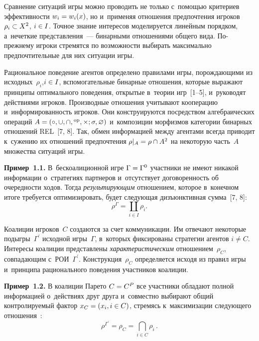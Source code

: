 \begin{multicols}{2}
Срав\-не\-ние 
ситуаций игры мож\-но проводить не только с~по\-мощью критериев эф\-фек\-тив\-ности 
$w_i\hm= w_i(x)$, но и~применяя отношения предпочтения игроков $\rho_i\hm\subset 
X^2$, $i\hm\in I$. Точ\-ное знание интересов моделируется линейным порядком, 
а~нечеткие пред\-став\-ле\-ния~--- бинарными отношениями общего вида. 
 По-преж\-не\-му игроки стремятся по воз\-мож\-ности выбирать максимально 
предпочтительные для них ситуации игры. 
    
    Рациональное поведение агентов определено правилами игры, по\-рож\-да\-ющи\-ми 
из исходных~$\rho_i$,\linebreak $i\hm\in I$, вспомогательные бинарные отношения, \mbox{которые} 
выражают принципы оптимального поведения, открытые в~тео\-рии игр~[1--5], 
и~руководят действиями игроков. Производные отношения \mbox{учитывают} кооперацию 
и~ин\-фор\-ми\-ро\-ван\-ность игроков. Они конструируются посредством ал\-геб\-ра\-и\-че\-ских 
операций ${A}\hm= (\circ, \cup, \cap, {}^{\mathrm{op}}, \times; \sigma, \varnothing)$ 
и~композиции морфизмов категории бинарных отношений REL~[7, 8]. Так, обмен 
информацией между агентами всегда приводит к~сужению их отношений 
предпочтения $\rho\vert_A \hm= \rho\cap A^2$ на некоторую часть~$A$ множества 
ситуаций игры.
    
    \textbf{Пример~1.1.} В~бескоалиционной игре $\Gamma\hm= \Gamma^0$ 
участ\-ни\-ки не имеют никакой информации о~стратегиях партнеров и~отсутствует 
до\-го\-во\-рен\-ность об оче\-ред\-ности ходов. Тогда \textit{ре\-зуль\-ти\-ру\-ющим} отношением, 
которое в~конечном итоге требуется оптимизировать, будет сле\-ду\-ющая 
дизъ\-юнк\-тив\-ная сумма~[7, 8]:
    \begin{equation}
    \rho^{\Gamma}= \coprod\limits_{i\in I} \rho_i.
    \label{e1.1-vas}
    \end{equation}
    
    Коалиции игроков~$C$ создаются за счет коммуникации. Им отвечают 
некоторые подыг\-ры~$\Gamma^\prime$ исходной игры~$\Gamma$, в~которых 
фиксированы стратегии агентов $i \not= C$. Интересы коалиции пред\-став\-ле\-ны 
\textit{характеристическим} отношением~$\rho_C$, сов\-па\-да\-ющим 
с~РОИ~$\Gamma^\prime$. Конструкция~$\rho_C$ 
определяется исходя из правил игры и~принципа рационального поведения 
участ\-ни\-ков коалиции. 
    
    \textbf{Пример~1.2.} В коалиции Парето $C\hm= C^P$ все участники обладают 
полной информацией о~действиях друг друга и~со\-вмест\-но выбирают общий 
конт\-ро\-ли\-ру\-емый фактор $x_C\hm= (x_i, i\in C)$, стремясь к~максимизации 
сле\-ду\-юще\-го от\-но\-ше\-ния~\cite{3-vas}:
    \begin{equation}
    \rho^{\Gamma^\prime} = \rho_C = \mathop{\bigcap}\limits_{i\in C} \rho_i\,.
    \label{e1.2-vas}
    \end{equation}
    

\end{multicols}
